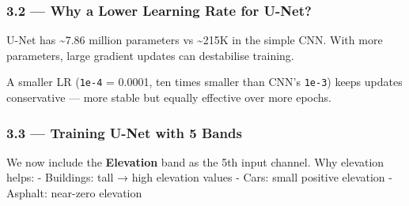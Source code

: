 \documentclass[11pt]{article}
\begin{document}
    \subsubsection{3.2 --- Why a Lower Learning Rate for
U-Net?}\label{why-a-lower-learning-rate-for-u-net}

U-Net has \textasciitilde7.86 million parameters vs \textasciitilde215K
in the simple CNN. With more parameters, large gradient updates can
destabilise training.

A smaller LR (\texttt{1e-4} = 0.0001, ten times smaller than CNN's
\texttt{1e-3}) keeps updates conservative --- more stable but equally
effective over more epochs.

\subsubsection{3.3 --- Training U-Net with 5
Bands}\label{training-u-net-with-5-bands}

We now include the \textbf{Elevation} band as the 5th input channel. Why
elevation helps: - Buildings: tall → high elevation values - Cars: small
positive elevation - Asphalt: near-zero elevation
\end{document}
